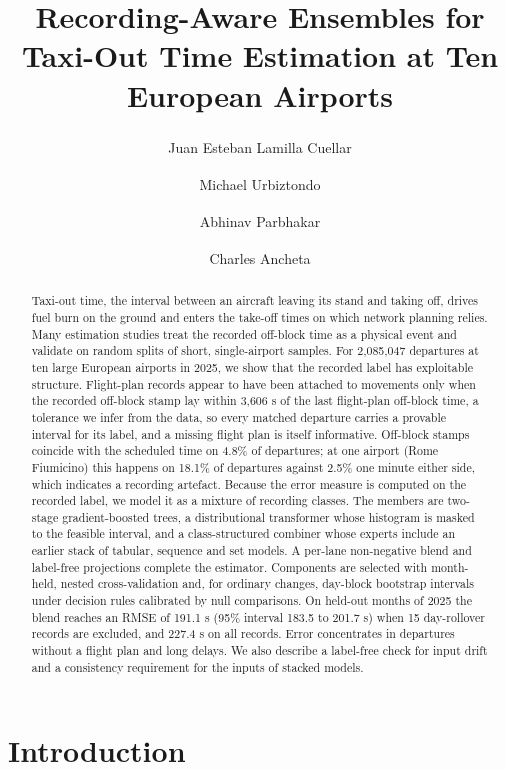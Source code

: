 \documentclass[
  manuscript=article,  %
  layout=preprint,  %
  year=20xx,
  volume=x,
]{extra/joas}
\title{Recording-Aware Ensembles for Taxi-Out Time Estimation at Ten European Airports}
\author{Juan Esteban Lamilla Cuellar\texorpdfstring{\textsuperscript{\textdagger}}{}}
\affiliation{University of Alberta, Edmonton, Canada\equalcontribution}
\author{Michael Urbiztondo\texorpdfstring{\textsuperscript{\textdagger}}{}}
\affiliation{University of Alberta, Edmonton, Canada\equalcontribution}
\author{Abhinav Parbhakar\texorpdfstring{\textsuperscript{\textdagger}}{}}
\affiliation{University of Alberta, Edmonton, Canada\equalcontribution}
\author{Charles Ancheta\texorpdfstring{\textsuperscript{\textdagger}}{}}
\affiliation{University of Alberta, Edmonton, Canada\equalcontribution}
\begin{document}
\begin{abstract}
Taxi-out time, the interval between an aircraft leaving its stand and taking off, drives fuel burn on the ground and enters the take-off times on which network planning relies. Many estimation studies treat the recorded off-block time as a physical event and validate on random splits of short, single-airport samples. For 2,085,047 departures at ten large European airports in 2025, we show that the recorded label has exploitable structure. Flight-plan records appear to have been attached to movements only when the recorded off-block stamp lay within 3,606 s of the last flight-plan off-block time, a tolerance we infer from the data, so every matched departure carries a provable interval for its label, and a missing flight plan is itself informative. Off-block stamps coincide with the scheduled time on 4.8\% of departures; at one airport (Rome Fiumicino) this happens on 18.1\% of departures against 2.5\% one minute either side, which indicates a recording artefact. Because the error measure is computed on the recorded label, we model it as a mixture of recording classes. The members are two-stage gradient-boosted trees, a distributional transformer whose histogram is masked to the feasible interval, and a class-structured combiner whose experts include an earlier stack of tabular, sequence and set models. A per-lane non-negative blend and label-free projections complete the estimator. Components are selected with month-held, nested cross-validation and, for ordinary changes, day-block bootstrap intervals under decision rules calibrated by null comparisons. On held-out months of 2025 the blend reaches an RMSE of 191.1 s (95\% interval 183.5 to 201.7 s) when 15 day-rollover records are excluded, and 227.4 s on all records. Error concentrates in departures without a flight plan and long delays. We also describe a label-free check for input drift and a consistency requirement for the inputs of stacked models.
\end{abstract}


\section{Introduction}
\label{sec:introduction}
\end{document}

